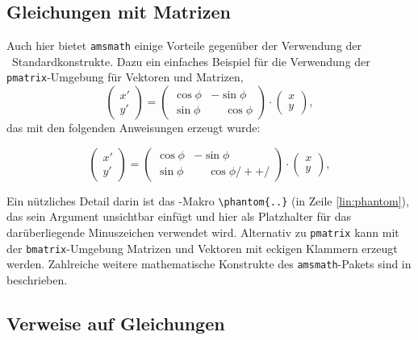 \subsection{Gleichungen mit Matrizen}

Auch hier bietet \texttt{amsmath} einige Vorteile gegenüber der Verwendung
der \latex\ Standardkonstrukte. Dazu ein einfaches Beispiel für die
Verwendung der \texttt{pmatrix}-Umgebung für Vektoren und Matrizen,
%
\begin{equation}
	\begin{pmatrix}
		x' \\ y'
	\end{pmatrix}
	=
	\begin{pmatrix}
		\cos \phi & -\sin \phi           \\
		\sin \phi & \phantom{-}\cos \phi
	\end{pmatrix}
	\cdot
	\begin{pmatrix}
		x \\ y
	\end{pmatrix} ,
\end{equation}
%
das mit den folgenden Anweisungen erzeugt wurde:
%
\begin{LaTeXCode}
\begin{equation}
	\begin{pmatrix} 
			x' \\ 
			y' 
	\end{pmatrix}
	= 
	\begin{pmatrix}
		  \cos \phi &          -\sin \phi \\
		  \sin \phi & \phantom{-}\cos \phi /+ \label{lin:phantom} +/
	\end{pmatrix} 
	\cdot
	\begin{pmatrix} 
			x \\ 
			y 
	\end{pmatrix} ,
\end{equation}
\end{LaTeXCode}
%
Ein nützliches Detail darin ist das \tex-Makro \verb!\phantom{..}! (in Zeile
\ref{lin:phantom}), das sein Argument unsichtbar einfügt und hier als
Platzhalter für das darüberliegende Minuszeichen verwendet wird. Alternativ
zu \texttt{pmatrix} kann mit der \texttt{bmatrix}-Umgebung Matrizen und
Vektoren mit eckigen Klammern erzeugt werden. Zahlreiche weitere
mathematische Konstrukte des \texttt{amsmath}-Pakets sind in
\cite{Mittelbach2023} beschrieben.


\subsection{Verweise auf Gleichungen}
\label{sec:VerweiseAufGleichungen}

